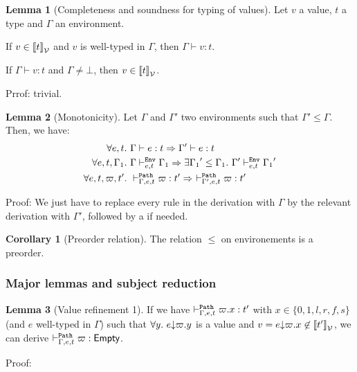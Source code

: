 \documentclass[a4paper]{article}
\theoremstyle{definition}
\newtheorem{lemma}{Lemma}
\newtheorem{corollary}{Corollary}
\begin{document}
        \begin{lemma}[Completeness and soundness for typing of values]
          Let $v$ a value, $t$ a type and $\Gamma$ an environment.

          If $v \in {\llbracket t \rrbracket}_{\mathcal{V}}$ and $v$ is well-typed in $\Gamma$, then $\Gamma\vdash v:t$.

          If $\Gamma \vdash v:t$ and $\Gamma\neq\bot$, then $v \in {\llbracket t \rrbracket}_{\mathcal{V}}$.
        \end{lemma}
        Prrof: trivial.
    
        \begin{lemma}[Monotonicity]
          Let $\Gamma$ and $\Gamma'$ two environments such that $\Gamma' \leq \Gamma$.
          Then, we have:
          \begin{align*}
            \forall e,t.\ &\Gamma \vdash e:t \Rightarrow \Gamma' \vdash e:t\\
            \forall e,t,\Gamma_1.\ &\Gamma \vdash^{\texttt{Env}}_{e,t} \Gamma_1 \Rightarrow \exists {\Gamma_1}'\leq \Gamma_1.\ \Gamma' \vdash^{\texttt{Env}}_{e,t} {\Gamma_1}'\\
            \forall e,t,\varpi,t'.\ &\vdash^{\texttt{Path}}_{\Gamma,e,t} \varpi:t' \Rightarrow\ \vdash^{\texttt{Path}}_{\Gamma',e,t} \varpi:t'
          \end{align*}
        \end{lemma}
        Proof: We just have to replace every  rule in the derivation with $\Gamma$
        by the relevant derivation with $\Gamma'$, followed by a  if needed.

        \begin{corollary}[Preorder relation]
          The relation $\leq$ on environements is a preorder.
        \end{corollary}

        \subsubsection{Major lemmas and subject reduction}

        \begin{lemma}[Value refinement 1]
          If we have $\vdash^{\texttt{Path}}_{\Gamma,e,t} \varpi.x:t'$ with $x\in\{0,1,l,r,f,s\}$ (and $e$ well-typed in $\Gamma$) such that $\forall y.\ e{\downarrow}\varpi.y$ is a value
          and $v = e{\downarrow}\varpi.x \not\in {\llbracket t' \rrbracket}_{\mathcal{V}}$, we can derive $\vdash^{\texttt{Path}}_{\Gamma,e,t} \varpi:\textsf{Empty}$.
        \end{lemma}

        Proof:
\end{document}
